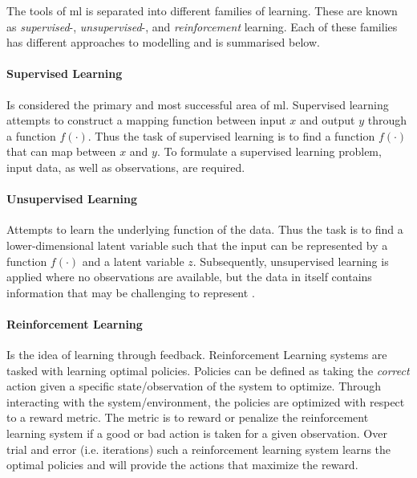 The tools of \gls{ml} is separated into different families of learning. These are known as \emph{supervised}-, \emph{unsupervised}-, and \emph{reinforcement} learning. Each of these families has different approaches to modelling and is summarised below. 

\paragraph{Supervised Learning}

Is considered the primary and most successful area of \gls{ml}. Supervised learning attempts to construct a mapping function between input $x$ and output $y$ through a function $f(\cdot)$. Thus the task of supervised learning is to find a function $f(\cdot)$ that can map between $x$ and $y$. To formulate a supervised learning problem, input data, as well as observations, are required. 

\paragraph{Unsupervised Learning}

Attempts to learn the underlying function of the data. Thus the task is to find a lower-dimensional latent variable such that the input can be represented by a function $f(\cdot)$ and a latent variable $z$. Subsequently, unsupervised learning is applied where no observations are available, but the data in itself contains information that may be challenging to represent \cite{M.Bishop2006}.

\paragraph{Reinforcement Learning}

Is the idea of learning through feedback. Reinforcement Learning systems are tasked with learning optimal policies. Policies can be defined as taking the \emph{correct} action given a specific state/observation of the system to optimize. Through interacting with the system/environment, the policies are optimized with respect to a reward metric. The metric is to reward or penalize the reinforcement learning system if a good or bad action is taken for a given observation. Over trial and error (i.e. iterations) such a reinforcement learning system learns the optimal policies and will provide the actions that maximize the reward. 

